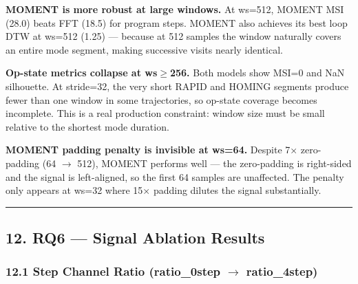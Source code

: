 \documentclass[11pt,a4paper]{article}
\begin{document}
\textbf{MOMENT is more robust at large windows.} At ws=512, MOMENT MSI (28.0) beats FFT (18.5) for
program steps. MOMENT also achieves its best loop DTW at ws=512 (1.25) --- because at 512
samples the window naturally covers an entire mode segment, making successive visits nearly
identical.

\textbf{Op-state metrics collapse at ws$\geq$256.} Both models show MSI=0 and NaN silhouette. At stride=32,
the very short RAPID and HOMING segments produce fewer than one window in some trajectories,
so op-state coverage becomes incomplete. This is a real production constraint: window size
must be small relative to the shortest mode duration.

\textbf{MOMENT padding penalty is invisible at ws=64.} Despite 7× zero-padding (64 $\rightarrow$ 512), MOMENT
performs well --- the zero-padding is right-sided and the signal is left-aligned, so the first
64 samples are unaffected. The penalty only appears at ws=32 where 15× padding dilutes the
signal substantially.

\vspace{4pt}\hrule\vspace{4pt}

\subsection{12. RQ6 --- Signal Ablation Results}

\subsubsection{12.1 Step Channel Ratio (ratio\_0step $\rightarrow$ ratio\_4step)}
\end{document}
